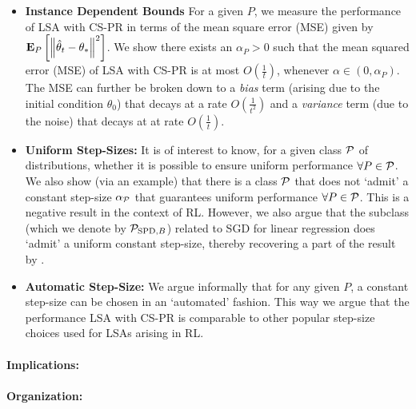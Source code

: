 \begin{itemize}[leftmargin=*]%
\item \textbf{Instance Dependent Bounds} For a given $P$, we  measure the performance of LSA with CS-PR in terms of the mean square error (MSE) given by $\EEP{\norm{\thh_t-\ts}^2}$. We show there exists an $\alpha_P>0$ such that the mean squared error (MSE) of LSA with CS-PR is at most $O(\frac{1}{t})$, whenever $\alpha\in (0,\alpha_P)$. The MSE can further be broken down to a \emph{bias} term (arising due to the initial condition $\theta_0$) that decays at a rate $O(\frac{1}{t^2})$ and a \emph{variance} term (due to the noise) that decays at at rate $O(\frac{1}{t})$.
\item \textbf{Uniform Step-Sizes:} It is of interest to know, for a given class $\P$ of distributions, whether it is possible to ensure uniform performance $\forall P\in \P$. We also show (via an example) that there is a class $\P$ that does not `admit' a constant step-size $\alpha_{\P}$ that guarantees uniform performance $\forall P\in \P$. This is a negative result in the context of RL. However, we also argue that the subclass (which we denote by $\P_{\text{SPD},B}$) related to SGD for linear regression does `admit' a uniform constant step-size, thereby recovering a part of the result by \citet{bach}.
\item \textbf{Automatic Step-Size:} We argue informally that for any given $P$, a constant step-size can be chosen in an `automated' fashion. This way we argue that the performance LSA with CS-PR is comparable to other popular step-size choices used for LSAs arising in RL.
\end{itemize}
\paragraph{Implications:}
\paragraph{Organization:}
